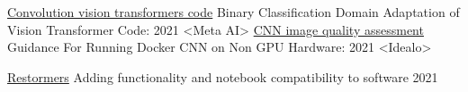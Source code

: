 \begin{cventries}

\cventry
    {\href{https://github.com/fdsig/convit}{Convolution vision transformers code}}
    {Binary Classification Domain Adaptation of Vision Transformer Code:}
    {   }
    {2021}
    {<Meta AI>}
\vspace{10pt}
\cventry
      {\href{https://github.com/idealo/image-quality-assessment}{CNN image quality assessment}} %
    {Guidance For Running Docker CNN on Non GPU Hardware:} %
    {} %
    {2021} %
    {<Idealo>}

\vspace{10pt}
 \cventry
      {\href{https://github.com/fdsig/Restormer}{Restormers}} %
    {Adding functionality and notebook compatibility to software} %
    {} %
    {2021} %
    {}
\end{cventries}